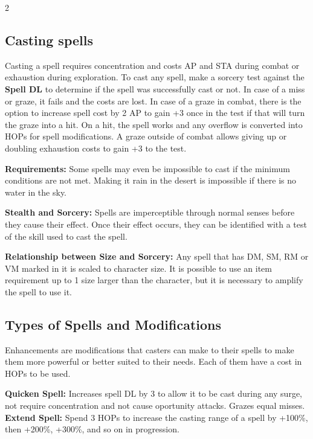 \begin{multicols}{2}
\subsection{Casting spells}

Casting a spell requires concentration and costs AP and STA during combat or exhaustion during exploration. To cast any spell, make a sorcery test against the \textbf{Spell DL} to determine if the spell was successfully cast or not. In case of a miss or graze, it fails and the costs are lost. In case of a graze in combat, there is the option to increase spell cost by 2 AP to gain +3 once in the test if that will turn the graze into a hit. On a hit, the spell works and any overflow is converted into HOPs for spell modifications. A graze outside of combat allows giving up or doubling exhaustion costs to gain +3 to the test.

\textbf{Requirements:} Some spells may even be impossible to cast if the minimum conditions are not met. Making it rain in the desert is impossible if there is no water in the sky.

\textbf{Stealth and Sorcery:} Spells are imperceptible through normal senses before they cause their effect. Once their effect occurs, they can be identified with a test of the skill used to cast the spell.

\textbf{Relationship between Size and Sorcery:} Any spell that has DM, SM, RM or VM marked in it is scaled to character size. It is possible to use an item requirement up to 1 size larger than the character, but it is necessary to amplify the spell to use it.


\subsection{Types of Spells and Modifications} %

Enhancements are modifications that casters can make to their spells to make them more powerful or better suited to their needs. Each of them have a cost in HOPs to be used.

\textbf{Quicken Spell:} Increases spell DL by 3 to allow it to be cast during any surge, not require concentration and not cause oportunity attacks. Grazes equal misses.\\

\textbf{Extend Spell:} Spend 3 HOPs to increase the casting range of a spell by +100\%, then +200\%, +300\%, and so on in progression.\\


\end{multicols}
